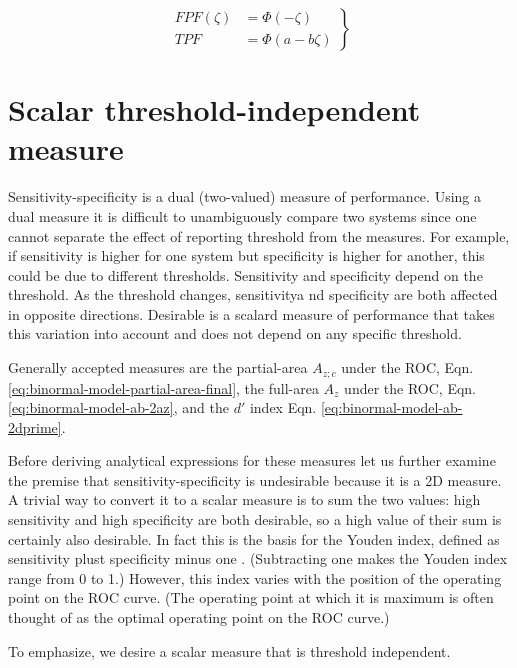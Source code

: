 \documentclass[
]{book}
\begin{document}
\begin{equation}
\left.
\begin{aligned}
FPF\left ( \zeta \right ) &= \Phi\left ( -\zeta \right )\\
TPF &= \Phi\left ( a - b \zeta \right )
\end{aligned}
\right \}
\label{eq:binormal-model-op-point-ab}
\end{equation}

\hypertarget{binormal-model-scalar-measure}{%
\section{Scalar threshold-independent measure}\label{binormal-model-scalar-measure}}

Sensitivity-specificity is a dual (two-valued) measure of performance. Using a dual measure it is difficult to unambiguously compare two systems since one cannot separate the effect of reporting threshold from the measures. For example, if sensitivity is higher for one system but specificity is higher for another, this could be due to different thresholds. Sensitivity and specificity depend on the threshold. As the threshold changes, sensitivitya nd specificity are both affected in opposite directions. Desirable is a scalard measure of performance that takes this variation into account and does not depend on any specific threshold.

Generally accepted measures are the partial-area \(A_{z;c}\) under the ROC, Eqn. \eqref{eq:binormal-model-partial-area-final}, the full-area \(A_z\) under the ROC, Eqn. \eqref{eq:binormal-model-ab-2az}, and the \(d'\) index Eqn. \eqref{eq:binormal-model-ab-2dprime}.

Before deriving analytical expressions for these measures let us further examine the premise that sensitivity-specificity is undesirable because it is a 2D measure. A trivial way to convert it to a scalar measure is to sum the two values: high sensitivity and high specificity are both desirable, so a high value of their sum is certainly also desirable. In fact this is the basis for the Youden index, defined as sensitivity plust specificity minus one \citep{youden1950index}. (Subtracting one makes the Youden index range from 0 to 1.) However, this index varies with the position of the operating point on the ROC curve. (The operating point at which it is maximum is often thought of as the optimal operating point on the ROC curve.)

To emphasize, we desire a scalar measure that is threshold independent.
\end{document}
